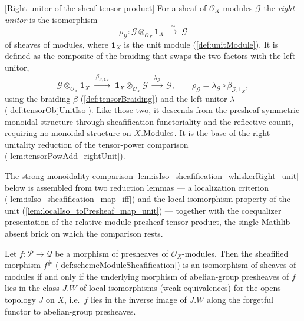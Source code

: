 \begin{definition}



[Right unitor of the sheaf tensor product]
  \label{def:tensorObjRightUnitor}
  For a sheaf of \(\mathcal{O}_X\)-modules \(\mathcal{G}\) the \emph{right unitor}
  is the isomorphism
  \[
    \rho_{\mathcal{G}} :
      \mathcal{G} \otimes_{\mathcal{O}_X} \mathbf{1}_X
      \;\xrightarrow{\ \sim\ }\; \mathcal{G}
  \]
  of sheaves of modules, where \(\mathbf{1}_X\) is the unit module
  (\cref{def:unitModule}). It is defined as the composite of the braiding that
  swaps the two factors with the left unitor,
  \[
    \mathcal{G} \otimes_{\mathcal{O}_X} \mathbf{1}_X
      \;\xrightarrow{\ \beta_{\mathcal{G}, \mathbf{1}_X}\ }\;
      \mathbf{1}_X \otimes_{\mathcal{O}_X} \mathcal{G}
      \;\xrightarrow{\ \lambda_{\mathcal{G}}\ }\;
      \mathcal{G},
    \qquad
    \rho_{\mathcal{G}}
      = \lambda_{\mathcal{G}} \circ \beta_{\mathcal{G}, \mathbf{1}_X},
  \]
  using the braiding \(\beta\) (\cref{def:tensorBraiding}) and the left unitor
  \(\lambda\) (\cref{def:tensorObjUnitIso}). Like those two, it descends from the
  presheaf symmetric monoidal structure through sheafification-functoriality and
  the reflective counit, requiring no monoidal structure on \(X.\mathrm{Modules}\). It is
  the base of the right-unitality reduction of the tensor-power comparison
  (\cref{lem:tensorPowAdd_rightUnit}).
\end{definition}





The strong-monoidality comparison \cref{lem:isIso_sheafification_whiskerRight_unit}
below is assembled from two reduction lemmas --- a localization criterion
(\cref{lem:isIso_sheafification_map_iff}) and the local-isomorphism property of
the unit (\cref{lem:localIso_toPresheaf_map_unit}) --- together with the
coequalizer presentation of the relative module-presheaf tensor product, the single
Mathlib-absent brick on which the comparison rests.

\begin{lemma}
  \label{lem:isIso_sheafification_map_iff}
  Let \(f : \mathcal{P} \to \mathcal{Q}\) be a morphism of presheaves of
  \(\mathcal{O}_X\)-modules. Then the sheafified morphism \(f^{\#}\)
  (\cref{def:schemeModuleSheafification}) is an isomorphism of sheaves of modules
  if and only if the underlying morphism of abelian-group presheaves of \(f\)
  lies in the class \(J.W\) of local isomorphisms (weak equivalences) for the
  opens topology \(J\) on \(X\), i.e.\ \(f\) lies in the inverse image of \(J.W\)
  along the forgetful functor to abelian-group presheaves.
\end{lemma}

